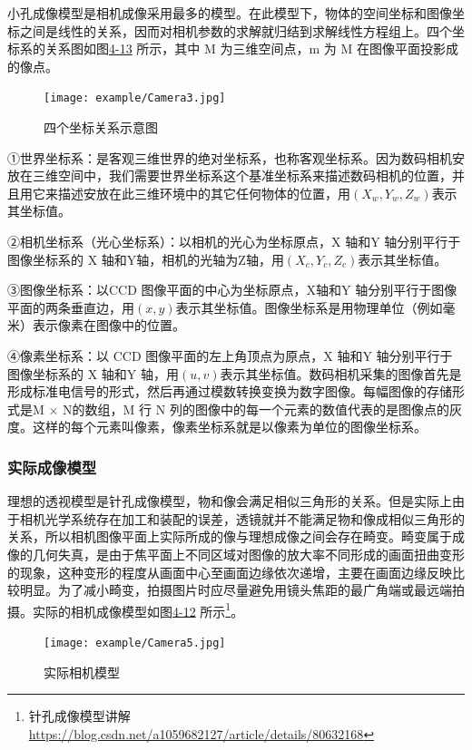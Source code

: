 小孔成像模型是相机成像采用最多的模型。在此模型下，物体的空间坐标和图像坐标之间是线性的关系，因而对相机参数的求解就归结到求解线性方程组上。四个坐标系的关系图如图\href{fig:4-13}{4-13} 所示，其中 M 为三维空间点，m 为 M 在图像平面投影成的像点。
\begin{figure}[!htp]
\centering
\texttt{[image: example/Camera3.jpg]}
\caption{四个坐标关系示意图}
\label{fig1:4-11}
\end{figure}

①世界坐标系：是客观三维世界的绝对坐标系，也称客观坐标系。因为数码相机安放在三维空间中，我们需要世界坐标系这个基准坐标系来描述数码相机的位置，并且用它来描述安放在此三维环境中的其它任何物体的位置，用$(X_w,Y_w,Z_w)$表示其坐标值。

②相机坐标系（光心坐标系）：以相机的光心为坐标原点，X 轴和Y 轴分别平行于图像坐标系的 X 轴和Y轴，相机的光轴为Z轴，用$(X_c,Y_c,Z_c)$表示其坐标值。

③图像坐标系：以CCD 图像平面的中心为坐标原点，X轴和Y 轴分别平行于图像平面的两条垂直边，用$(x,y)$表示其坐标值。图像坐标系是用物理单位（例如毫米）表示像素在图像中的位置。

④像素坐标系：以 CCD 图像平面的左上角顶点为原点，X 轴和Y 轴分别平行于图像坐标系的 X 轴和Y 轴，用$(u,v)$表示其坐标值。数码相机采集的图像首先是形成标准电信号的形式，然后再通过模数转换变换为数字图像。每幅图像的存储形式是M $\times$ N的数组，M 行 N 列的图像中的每一个元素的数值代表的是图像点的灰度。这样的每个元素叫像素，像素坐标系就是以像素为单位的图像坐标系。

\subsubsection{实际成像模型}

理想的透视模型是针孔成像模型，物和像会满足相似三角形的关系。但是实际上由于相机光学系统存在加工和装配的误差，透镜就并不能满足物和像成相似三角形的关系，所以相机图像平面上实际所成的像与理想成像之间会存在畸变。畸变属于成像的几何失真，是由于焦平面上不同区域对图像的放大率不同形成的画面扭曲变形的现象，这种变形的程度从画面中心至画面边缘依次递增，主要在画面边缘反映比较明显。为了减小畸变，拍摄图片时应尽量避免用镜头焦距的最广角端或最远端拍摄。实际的相机成像模型如图\href{fig:4-12}{4-12} 所示\footnote{针孔成像模型讲解 \quad \url{https://blog.csdn.net/a1059682127/article/details/80632168}}。
\begin{figure}[!htp]
\centering
\texttt{[image: example/Camera5.jpg]}
\caption{实际相机模型}
\label{fig1:4-12}
\end{figure}


